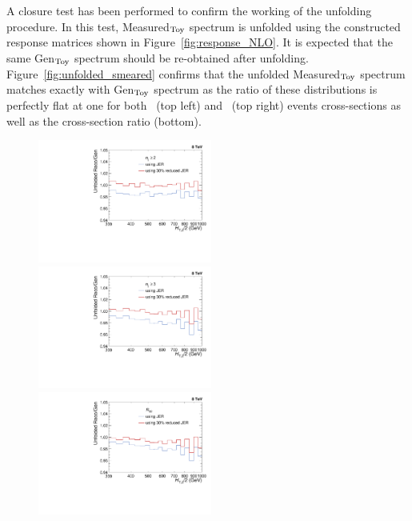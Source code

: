 A closure test has been performed to confirm the working of the unfolding procedure. In this test, Measured$_{\rm Toy}$ spectrum is unfolded using the constructed response matrices shown in Figure~\ref{fig:response_NLO}. It is expected that the same Gen$_{\rm Toy}$ spectrum should be re-obtained after unfolding. Figure~\ref{fig:unfolded_smeared} confirms that the unfolded Measured$_{\rm Toy}$ spectrum matches exactly with Gen$_{\rm Toy}$ spectrum as the ratio of these distributions is perfectly flat at one for both \njt~(top left) and \njth~(top right) events cross-sections as well as the cross-section ratio \ratio (bottom).

\begin{figure}[!h]
 \begin{center}
 \hspace*{-3mm}\includegraphics[width=0.51\textwidth]{Plots_HT_2_150/Comparison_closure_2_range.pdf}%
 ~~\includegraphics[width=0.51\textwidth]{Plots_HT_2_150/Comparison_closure_3.pdf}\\
 \includegraphics[width=0.51\textwidth]{Plots_HT_2_150/Comparison_closure_ratio_32_now.pdf}

\end{center}
\end{figure}

